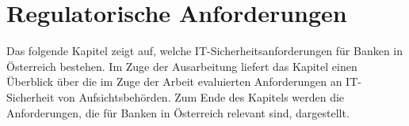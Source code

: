 \setlength{\parindent}{0em} 

\chapter{Regulatorische Anforderungen}
\label{cha:regulatorische_anforderungen_und_vorgaben}
Das folgende Kapitel zeigt auf, welche IT-Sicherheitsanforderungen für Banken in Österreich bestehen. Im Zuge der Ausarbeitung liefert das Kapitel einen Überblick über die im Zuge der Arbeit evaluierten Anforderungen an IT-Sicherheit von Aufsichtsbehörden. Zum Ende des Kapitels werden die Anforderungen, die für Banken in Österreich relevant sind, dargestellt.
\bigbreak
